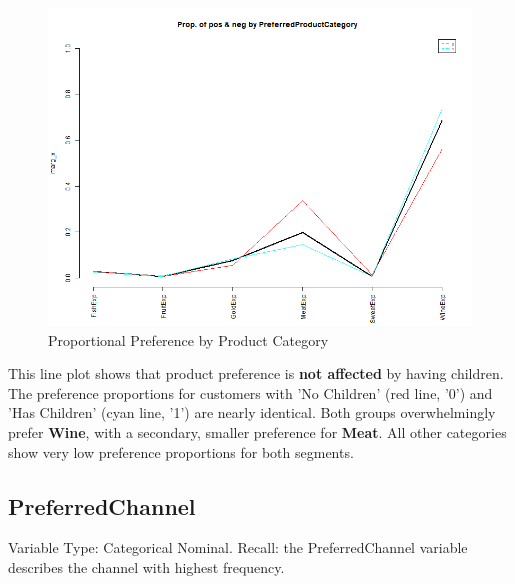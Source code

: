 \begin{figure}[H]
    \centering
    \includegraphics[width= 1\linewidth]{Imatges/prop_cond_class_var_x_PreferredProductCategory_6_legend.png}
    \caption{Proportional Preference by Product Category}
    \label{fig:scree_plot_9} %
\end{figure}

This line plot shows that product preference is \textbf{not affected} by having children. The preference proportions for customers with 'No Children' (red line, '0') and 'Has Children' (cyan line, '1') are nearly identical. Both groups overwhelmingly prefer \textbf{Wine}, with a secondary, smaller preference for \textbf{Meat}. All other categories show very low preference proportions for both segments.

\newpage
\subsection{PreferredChannel}
Variable Type: Categorical Nominal. 
Recall: the PreferredChannel variable describes the channel with highest frequency.

